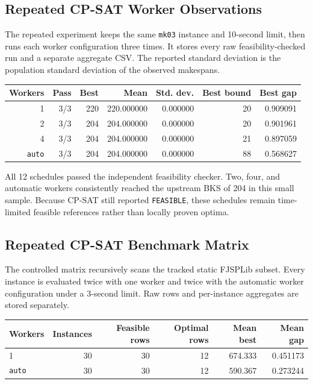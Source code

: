 ﻿\documentclass[11pt]{article}
\begin{document}
\subsection{Repeated CP-SAT Worker Observations}

The repeated experiment keeps the same \texttt{mk03} instance and 10-second
limit, then runs each worker configuration three times. It stores every raw
feasibility-checked run and a separate aggregate CSV. The reported standard
deviation is the population standard deviation of the observed makespans.

\begin{table}[h]
\centering
\begin{tabular}{rrrrrrr}
\toprule
Workers & Pass & Best & Mean & Std. dev. & Best bound & Best gap \\
\midrule
1 & 3/3 & 220 & 220.000000 & 0.000000 & 20 & 0.909091 \\
2 & 3/3 & 204 & 204.000000 & 0.000000 & 20 & 0.901961 \\
4 & 3/3 & 204 & 204.000000 & 0.000000 & 21 & 0.897059 \\
\texttt{auto} & 3/3 & 204 & 204.000000 & 0.000000 & 88 & 0.568627 \\
\bottomrule
\end{tabular}
\end{table}

All 12 schedules passed the independent feasibility checker. Two, four, and
automatic workers consistently reached the upstream BKS of 204 in this small
sample. Because CP-SAT still reported \texttt{FEASIBLE}, these schedules remain
time-limited feasible references rather than locally proven optima.

\subsection{Repeated CP-SAT Benchmark Matrix}

The controlled matrix recursively scans the tracked static FJSPLib subset.
Every instance is evaluated twice with one worker and twice with the automatic
worker configuration under a 3-second limit. Raw rows and per-instance
aggregates are stored separately.

\begin{table}[h]
\centering
\begin{tabular}{lrrrrr}
\toprule
Workers & Instances & Feasible rows & Optimal rows & Mean best & Mean gap \\
\midrule
1 & 30 & 30 & 12 & 674.333 & 0.451173 \\
\texttt{auto} & 30 & 30 & 12 & 590.367 & 0.273244 \\
\bottomrule
\end{tabular}
\end{table}
\end{document}
